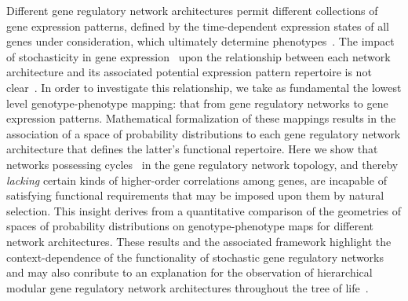 Different gene regulatory network architectures permit different collections of gene expression patterns, defined by the time-dependent expression states of all genes under consideration, which ultimately determine phenotypes~\cite{Alon2007,Milo2004}. The impact of stochasticity in gene expression~\cite{Eldar2010,Sanchez2013} upon the relationship between each network architecture and its associated potential expression pattern repertoire is not clear~\cite{Jothi2009,Golding2005,Lestas2010,Hilfinger2012,Chalancon2012}. In order to investigate this relationship, we take as fundamental the lowest level genotype-phenotype mapping: that from gene regulatory networks to gene expression patterns. Mathematical formalization of these mappings results in the association of a space of probability distributions to each gene regulatory network architecture that defines the latter's functional repertoire. Here we show that networks possessing cycles~\cite{Wainwright2007} in the gene regulatory network topology, and thereby \emph{lacking} certain kinds of higher-order correlations among genes, are incapable of satisfying functional requirements that may be imposed upon them by natural selection. This insight derives from a quantitative comparison of the geometries of spaces of probability distributions on genotype-phenotype maps for different network architectures. These results and the associated framework highlight the context-dependence of the functionality of stochastic gene regulatory networks and may also conribute to an explanation for the observation of hierarchical modular gene regulatory network architectures throughout the tree of life~\cite{Ravasz2002,Segre2005,Wagner2007,Erwin2009,Jothi2009,Bhardwaj2010,Colm}.


